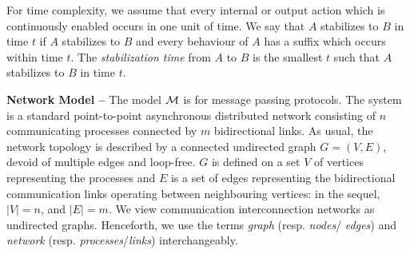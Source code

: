 \documentclass[10pt]{article}
\begin{document}
For time complexity, we assume that every internal or output action which
is continuously enabled occurs in one unit of time. We say that $A$
stabilizes to $B$ in time $t$ if $A$ stabilizes to $B$ and every behaviour
of $A$ has a suffix which occurs within time $t$. The {\em stabilization
time} from $A$ to $B$ is the smallest $t$ such that $A$ stabilizes to $B$
in time $t$.

{\bf Network Model --} The model $\cal M$ is for message passing
protocols. The system is a standard point-to-point asynchronous
distributed network consisting of $n$ communicating processes
connected by $m$ bidirectional links. As usual, the network topology
is described by a connected undirected graph $G = (V,E)$, devoid of
multiple edges and loop-free. $G$ is defined on a set $V$ of vertices
representing the processes and $E$ is a set of edges representing the
bidirectional communication links operating between neighbouring
vertices: in the sequel, $|V| = n$, and $|E| = m$.  We view
communication interconnection networks as undirected graphs.
Henceforth, we use the terms {\em graph} (resp. {\em nodes}/{\em
edges}) and {\em network} (resp. {\em processes}/{\em links})
interchangeably.
\end{document}
